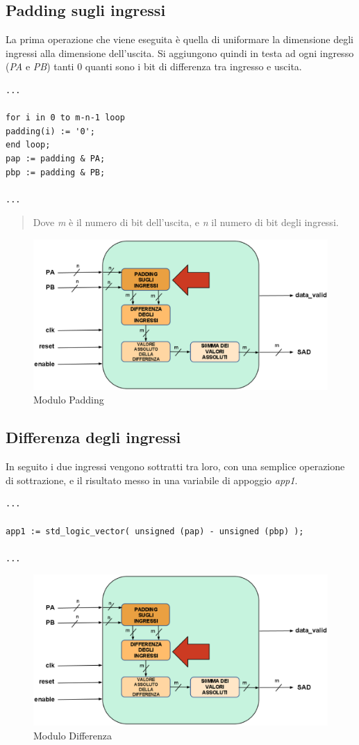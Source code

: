 \documentclass[12pt, a4paper]{article}
\begin{document}
\subsection{Padding sugli ingressi}
La prima operazione che viene eseguita è quella di uniformare la dimensione degli ingressi alla dimensione dell'uscita. Si aggiungono quindi in testa ad ogni ingresso (\textit{PA} e \textit{PB}) tanti 0 quanti sono i bit di differenza tra ingresso e uscita.
{\fontsize{8}{8}
\begin{verbatim}
...

for i in 0 to m-n-1 loop
padding(i) := '0';
end loop;
pap := padding & PA;
pbp := padding & PB;

...
\end{verbatim}
}
\begin{quote}
Dove \textit{m} è il numero di bit dell'uscita, e \textit{n} il numero di bit degli ingressi.
\end{quote}		
\begin{figure}[h!]
\centering
\includegraphics[scale=0.3]{images/padding.eps}
\caption{Modulo Padding}\label{fig:4}
\end{figure}
\newpage
\subsection{Differenza degli ingressi}
In seguito i due ingressi vengono sottratti tra loro, con una semplice operazione di sottrazione, e il risultato messo in una variabile di appoggio \textit{app1}.
{\fontsize{8}{8}
\begin{verbatim}
...

app1 := std_logic_vector( unsigned (pap) - unsigned (pbp) );

...
\end{verbatim}
}
\begin{figure}[h!]
\centering
\includegraphics[scale=0.3]{images/differenza.eps}
\caption{Modulo Differenza}\label{fig:5}
\end{figure}
\newpage
\end{document}
